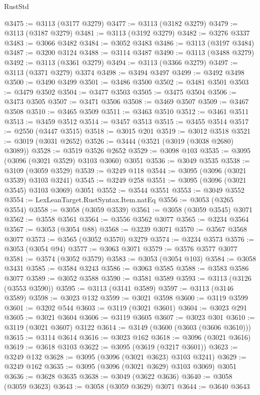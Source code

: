 \begin{lexlean}{RustStd}
\begin{coremodule}
@3475 := @3113 (@3177 @3279)
@3477 := @3113 (@3182 @3279)
@3479 := @3113 (@3187 @3279)
@3481 := @3113 (@3192 @3279)
@3482 := @3276 @3337
@3483 := @3066 @3482
@3484 := @3052 @3483
@3486 := @3113 (@3197 @3484)
@3487 := @3200 @3124
@3488 := @3114 @3487
@3490 := @3113 (@3488 @3279)
@3492 := @3113 (@3361 @3279)
@3494 := @3113 (@3366 @3279)
@3497 := @3113 (@3371 @3279) @3374
@3498 := @3494 @3497
@3499 := @3492 @3498
@3500 := @3490 @3499
@3501 := @3486 @3500
@3502 := @3481 @3501
@3503 := @3479 @3502
@3504 := @3477 @3503
@3505 := @3475 @3504
@3506 := @3473 @3505
@3507 := @3471 @3506
@3508 := @3469 @3507
@3509 := @3467 @3508
@3510 := @3465 @3509
@3511 := @3463 @3510
@3512 := @3461 @3511
@3513 := @3459 @3512
@3514 := @3457 @3513
@3515 := @3455 @3514
@3517 := @2550 (@3447 @3515)
@3518 := @3015 @201
@3519 := @3012 @3518
@3521 := @3019 (@3031 @2652)
@3526 := @3444 (@3521 (@3019 (@3038 @2680) @3089))
@3528 := @3519 @3526 @2652
@3529 := @3098 @103
@3535 := @3095 (@3096 (@3021 @3529) @3103 @3060) @3051
@3536 := @3049 @3535
@3538 := @3109 (@3059 @3529)
@3539 := @3249 @118
@3544 := @3095 (@3096 (@3021 @3539) @3103 @3241)
@3545 := @3249 @258
@3551 := @3095 (@3096 (@3021 @3545) @3103 @3069) @3051
@3552 := @3544 @3551
@3553 := @3049 @3552
@3554 := LexLeanTarget.RustSyntax.Item.natEq
@3556 := @3053 (@3265 @3554)
@3558 := @3058 (@3059 @3539)
@3561 := @3058 (@3059 @3545) @3071
@3562 := @3558 @3561
@3564 := @3556 @3562 @3077
@3565 := @3234 @3564
@3567 := @3053 (@3054 @88)
@3568 := @3239 @3071
@3570 := @3567 @3568 @3077
@3573 := @3565 (@3052 @3570) @3279
@3574 := @3234 @3573
@3576 := @3053 (@3054 @94)
@3577 := @3063 @3071
@3579 := @3576 @3577 @3077
@3581 := @3574 (@3052 @3579)
@3583 := @3053 (@3054 @103)
@3584 := @3058 @3431
@3585 := @3584 @3243
@3586 := @3063 @3585
@3588 := @3583 @3586 @3077
@3589 := @3052 @3588
@3590 := @3581 @3589
@3593 := @3113 (@3126 (@3553 @3590))
@3595 := @3113 (@3141 @3589)
@3597 := @3113 (@3146 @3589)
@3598 := @3023 @132
@3599 := @3021 @3598
@3600 := @3119 @3599
@3601 := @3202 @544
@3603 := @3119 (@3021 @3601)
@3604 := @3023 @291
@3605 := @3021 @3604
@3606 := @3119 @3605
@3607 := @3023 @301
@3610 := @3119 (@3021 @3607) @3122
@3614 := @3149 (@3600 (@3603 (@3606 @3610)))
@3615 := @3114 @3614
@3616 := @3023 @162
@3618 := @3096 (@3021 @3616)
@3619 := @3618 @3103
@3622 := @3095 (@3619 (@3217 @3601))
@3623 := @3249 @132
@3628 := @3095 (@3096 (@3021 @3623) @3103 @3241)
@3629 := @3249 @162
@3635 := @3095 (@3096 (@3021 @3629) @3103 @3069) @3051
@3636 := @3628 @3635
@3638 := @3049 (@3622 @3636)
@3640 := @3058 (@3059 @3623)
@3643 := @3058 (@3059 @3629) @3071
@3644 := @3640 @3643

\end{coremodule}
\end{lexlean}
